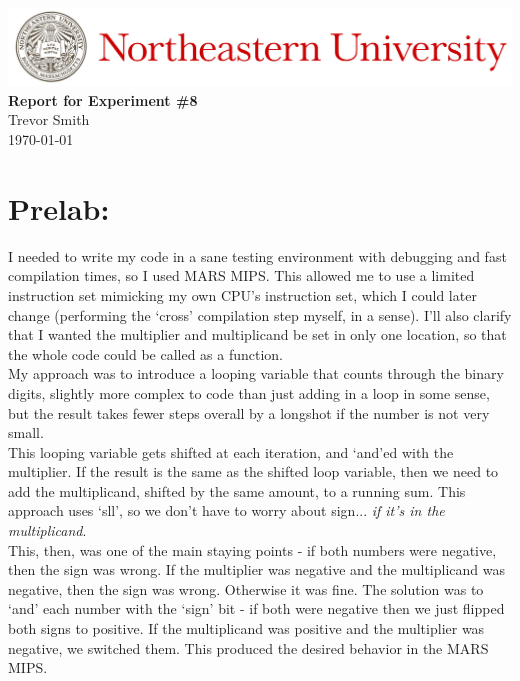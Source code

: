 \documentclass[12pt,a4paper]{article}
\begin{document}
\begin{center}
    \includegraphics[width=\textwidth]{./Images/Header.jpeg}
    \vfill
    \textbf{\Large{Report for Experiment \#8\\
    }}
    \vfill
    Trevor Smith\\
    \today
    \vfill
\end{center}

\newpage


\section*{Prelab:}

I needed to write my code in a sane testing environment with debugging and
fast compilation times, so I used MARS MIPS. This allowed me to use a
limited instruction set mimicking my own CPU's instruction set, which I could
later change (performing the `cross' compilation step myself, in a sense).
I'll also clarify that I wanted the multiplier and multiplicand be set in only
one location, so that the whole code could be called as a function. \\

My approach was to introduce a looping variable that counts through the binary digits,
slightly more complex to code than just adding in a loop in some sense, but the
result takes fewer steps overall by a longshot if the number is not very small. \\

This looping variable gets shifted at each iteration, and `and'ed with the multiplier.
If the result is the same as the shifted loop variable, then we need to add the
multiplicand, shifted by the same amount, to a running sum. This approach uses `sll',
so we don't have to worry about sign... \emph{if it's in the multiplicand}. \\

This, then, was one of the main staying points - if both numbers were negative, then
the sign was wrong. If the multiplier was negative and the multiplicand was negative,
then the sign was wrong. Otherwise it was fine. The solution was to `and' each number
with the `sign' bit - if both were negative then we just flipped both signs to positive.
If the multiplicand was positive and the multiplier was negative, we switched them.
This produced the desired behavior in the MARS MIPS. \\
\end{document}
